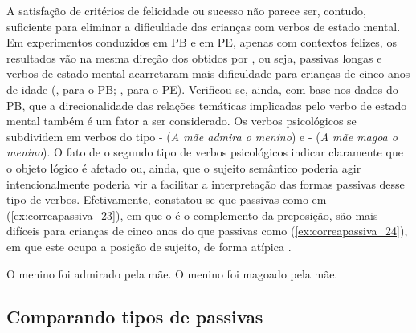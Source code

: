 \documentclass[output=paper]{LSP/langsci}
\begin{document}
A satisfação de critérios de felicidade ou sucesso não parece ser, contudo, suficiente para eliminar a dificuldade das crianças com verbos de estado mental. Em experimentos conduzidos em PB e em PE, apenas com contextos felizes, os resultados vão na mesma direção dos obtidos por \citet{foxgrodzinsky1998}, ou seja, passivas longas e verbos de estado mental acarretaram mais dificuldade para crianças de cinco anos de idade (\citealt{limajunior2012}, para o PB; \citealt{estrela2013}, para o PE). Verificou-se, ainda, com base nos dados do PB, que a direcionalidade das relações temáticas implicadas pelo verbo de estado mental também é um fator a ser considerado. Os verbos psicológicos se subdividem em verbos do tipo - (\textit{A mãe admira o menino}) e - (\textit{A mãe magoa o menino}). O fato de o segundo tipo de verbos psicológicos indicar claramente que o objeto lógico é afetado ou, ainda, que o sujeito semântico poderia agir intencionalmente poderia vir a facilitar a interpretação das formas passivas desse tipo de verbos. Efetivamente, constatou-se que passivas como em (\ref{ex:correapassiva_23}), em que o  é o complemento da preposição, são mais difíceis para crianças de cinco anos do que passivas como (\ref{ex:correapassiva_24}), em que este ocupa a posição de sujeito, de forma atípica \citep{limajunioraugusto2014}. 

\ea\label{ex:correapassiva_23}
O menino foi admirado pela mãe.
\z
\ea\label{ex:correapassiva_24}
O menino foi magoado pela mãe.
\z

\subsection{Comparando tipos de passivas}
\label{subsec:correapassiva_comparando}
\end{document}
